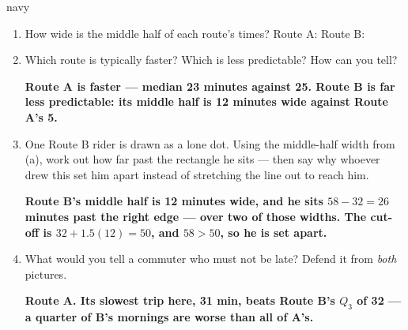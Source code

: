 \documentclass[12pt]{article}
\newcommand{\answerspace}[2]{\par\nopagebreak\noindent\begin{minipage}[t][#1][t]{\linewidth}%
  \color{keyred}\bfseries #2\end{minipage}\par}
\begin{document}
\begin{scenariobox}{navy}
\normalsize
\begin{enumerate}[label=\textbf{\alph*.}, leftmargin=1.8em, itemsep=4pt]
  \item How wide is the middle half of each route's times? \quad Route A:  \quad
        Route B: 
  \item Which route is typically faster? Which is less predictable? How can you tell?
        \answerspace{1.6cm}{Route A is faster --- median 23 minutes against 25. Route B is far
        less predictable: its middle half is 12 minutes wide against Route A's 5.}
  \item One Route B rider is drawn as a lone dot. Using the middle-half width from (a), work out
        how far past the rectangle he sits --- then say why whoever drew this set him apart
        instead of stretching the line out to reach him.
        \answerspace{2.0cm}{Route B's middle half is 12 minutes wide, and he sits $58-32=26$
        minutes past the right edge --- over two of those widths. The cut-off is
        $32 + 1.5(12) = 50$, and $58 > 50$, so he is set apart.}
  \item What would you tell a commuter who must not be late? Defend it from \emph{both} pictures.
        \answerspace{1.4cm}{Route A. Its slowest trip here, 31 min, beats Route B's $Q_3$ of 32
        --- a quarter of B's mornings are worse than all of A's.}
\end{enumerate}
\end{scenariobox}
\end{document}
